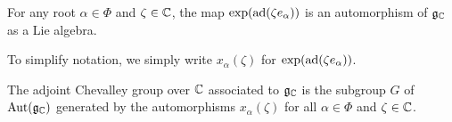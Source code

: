\begin{cor}\label{cor:xalpha_automorphism}
    For any root $\alpha\in\Phi$ and $\zeta\in \mathbb{C}$, the map $\exp(\mathrm{ad}(\zeta e_\alpha))$ is an automorphism of $\fg_\CC$ as a Lie algebra.
\end{cor}

To simplify notation, we simply write $x_\alpha(\zeta)$ for $\exp(\mathrm{ad}(\zeta e_\alpha))$. 
\iffalse In addition, for any $\chi\in\Hom(\ZZ\Phi,\CC^*)$, we define the automorphism of $\fg_\CC$ given by
\begin{align*}
    h(\chi):\fg_\CC & \longrightarrow\fg_\CC  \\
    h_i & \longmapsto h_i\quad\quad\quad\text{ for all }1\leq i\leq n,\\
    e_\alpha &\longmapsto \chi(\alpha)e_\alpha\quad \text{ for all }\alpha\in\Phi.
\end{align*}
The fact that $\chi$ is a multiplicative character implies that $h(\chi)$ is a Lie algebra automorphism of $\fg_\CC$. \fi

\begin{definition}
    The adjoint Chevalley group over $\mathbb{C}$ associated to $\fg_\CC$ is the subgroup $G$ of $\mathrm{Aut}(\mathfrak{g}_{\mathbb{C}})$ generated by the automorphisms $x_\alpha(\zeta)$ for all $\alpha\in\Phi$ and $\zeta\in\mathbb{C}$.
    \iffalse
    $$\text{  and  }\{h(\chi):\chi\in\Hom(\ZZ\Phi,\CC^*)\}.$$
    \fi
\end{definition}

